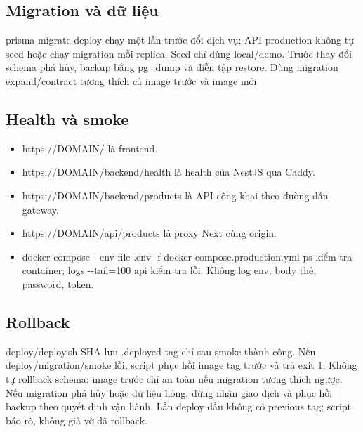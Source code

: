 \documentclass[a4paper,12pt,oneside]{report}
\begin{document}
\subsection{Migration và dữ liệu}
{\small\ttfamily prisma migrate deploy} chạy một lần trước đổi dịch vụ; API production không tự seed hoặc chạy migration mỗi replica. Seed chỉ dùng local/\allowbreak{}demo. Trước thay đổi schema phá hủy, backup bằng pg\_dump và diễn tập restore. Dùng migration expand/\allowbreak{}contract tương thích cả image trước và image mới.


\subsection{Health và smoke}
\begin{itemize}
\item {\small\ttfamily https:/\allowbreak{}/\allowbreak{}DOMAIN/\allowbreak{}} là frontend.
\item {\small\ttfamily https:/\allowbreak{}/\allowbreak{}DOMAIN/\allowbreak{}backend/\allowbreak{}health} là health của NestJS qua Caddy.
\item {\small\ttfamily https:/\allowbreak{}/\allowbreak{}DOMAIN/\allowbreak{}backend/\allowbreak{}products} là API công khai theo đường dẫn gateway.
\item {\small\ttfamily https:/\allowbreak{}/\allowbreak{}DOMAIN/\allowbreak{}api/\allowbreak{}products} là proxy Next cùng origin.
\item {\small\ttfamily docker compose -\allowbreak{}-\allowbreak{}env-\allowbreak{}file .\allowbreak{}env -\allowbreak{}f docker-\allowbreak{}compose.\allowbreak{}production.\allowbreak{}yml ps} kiểm tra container; {\small\ttfamily logs -\allowbreak{}-\allowbreak{}tail=100 api} kiểm tra lỗi. Không log env, body thẻ, password, token.
\end{itemize}

\subsection{Rollback}
{\small\ttfamily deploy/\allowbreak{}deploy.\allowbreak{}sh SHA} lưu {\small\ttfamily .\allowbreak{}deployed-\allowbreak{}tag} chỉ sau smoke thành công. Nếu deploy/\allowbreak{}migration/\allowbreak{}smoke lỗi, script phục hồi image tag trước và trả exit 1. Không tự rollback schema: image trước chỉ an toàn nếu migration tương thích ngược. Nếu migration phá hủy hoặc dữ liệu hỏng, dừng nhận giao dịch và phục hồi backup theo quyết định vận hành. Lần deploy đầu không có previous tag; script báo rõ, không giả vờ đã rollback.
\end{document}
